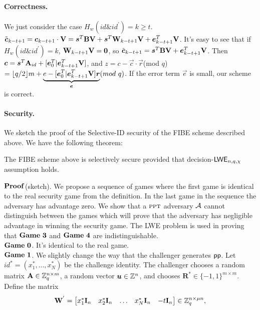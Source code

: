 \paragraph{Correctness.} We just consider the case $H_{w}(id \& id^{'})=k\geq t$. $\tilde{\boldsymbol{c}}_{k-t+1}=\boldsymbol{c}_{k-t+1}\cdot \mathbf{V}=\boldsymbol{s}^{T}\mathbf{B}\mathbf{V}+\boldsymbol{s}^{T}\mathbf{W}_{k-t+1}\mathbf{V}+\boldsymbol{e}^{T}_{k-t+1}\mathbf{V}$. It's easy to see that if $H_{w}(id \& id^{'})=k$, $\mathbf{W}_{k-t+1}\mathbf{V}=\mathbf{0}$, so $\tilde{\boldsymbol{c}}_{k-t+1}=\boldsymbol{s}^{T}\mathbf{B}\mathbf{V}+\boldsymbol{e}^{T}_{k-t+1}\mathbf{V}$. Then $\boldsymbol{c}=\boldsymbol{s}^{T}\mathbf{A}_{id}+[\boldsymbol{e}^{T}_{0}|\boldsymbol{e}^{T}_{k-t+1}\mathbf{V}]$, and $z=c-\vec{c}\cdot \vec{r}$(mod $q$)$=\lfloor q/2 \rfloor m+\underbrace{e-[\vec{e}^{T}_{0}|\vec{e}^{T}_{k-t+1}\mat{V}]\vec{r}}_{\vec{e}}(mod\ q)$. If the error term $\vec{e}$ is small, our scheme is correct.
\paragraph{Security.} We sketch the proof of the Selective-ID security of the FIBE scheme described above. We have the following theorem:
\begin{theorem}
The FIBE scheme above is selectively secure provided that decision-$\mathsf{LWE}_{n,q,\chi}$ assumption holds.
\end{theorem}
\noindent $\mathbf{Proof}$(sketch). We propose a sequence of games where the first game is identical to the real security game from the definition. In the last game in the sequence the adversary has advantage zero. We show that a $\textsc{ppt}$ adversary $\mathcal{A}$ cannot distinguish between the games which will prove that the adversary has negligible advantage in winning the security game. The LWE problem is used in proving that $\mathbf{Game\ 3}$ and $\mathbf{Game\ 4}$ are indistinguishable.\\[0.2cm]
$\mathbf{Game\ 0}$. It's identical to the real game.\\[0.2cm]
$\mathbf{Game\ 1}$. We slightly change the way that the challenger generates $\mathsf{pp}$. Let $id^{*}=(x^{*}_{1},...,x^{*}_{N})$ be the challenge identity. The challenger chooses a random matrix $\mathbf{A} \in \mathbb{Z}^{n \times m}_{q}$, a random vector $\boldsymbol{u} \in \mathbb{Z}^{n}$, and chooses $\textbf{R}^{*}\in \{-1,1\}^{m \times m}$. Define the matrix
\begin{equation}
\mathbf{W}^{'}= \begin{bmatrix}
x^{*}_{1} \mathbf{I}_{n}&x^{*}_{2} \mathbf{I}_{n}&\ldots&x^{*}_{N} \mathbf{I}_{n}&-t \mathbf{I}_{n}
\end{bmatrix} \in \mathbb{Z}^{n \times \mu n}_{q},
\end{equation}
